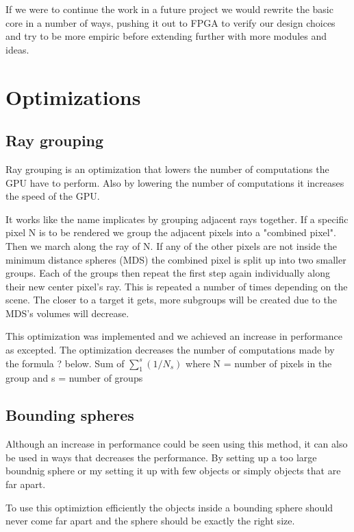 			If we were to continue the work in a future project we would
			rewrite the basic core in a number of ways, pushing it out to FPGA
			to verify our design choices and try to be more empiric before
			extending further with more modules and ideas. 

	\section{Optimizations}

		\subsection{Ray grouping}
		
			Ray grouping is an optimization that lowers the number of
			computations the GPU have to perform. Also by lowering the number of
			computations it increases the speed of the GPU.
			
			It works like the name implicates by grouping adjacent rays
			together. If a specific pixel N is to be rendered we group the
			adjacent pixels into a "combined pixel". Then we march along the
			ray of N. If any of the other pixels are not inside the minimum
			distance spheres (MDS) the combined pixel is split up into two
			smaller groups. Each of the groups then repeat the first step again
			individually along their new center pixel's ray. This is repeated a
			number of times depending on the scene.  The closer to a target it
			gets, more subgroups will be created due to the MDS's volumes will
			decrease.
			
			This optimization was implemented and we achieved an increase in
			performance as excepted. The optimization decreases the number of
			computations made by the formula ? below.  Sum of $\sum_1^s(1/N_s)$
			where N = number of pixels in the group and s = number of groups


		\subsection{Bounding spheres}
			
			Although an increase in performance could be seen using this method,
			it can also be used in ways that decreases the performance. By
			setting up a too large boundnig sphere or my setting it up with few
			objects or simply objects that are far apart.

			To use this optimiztion efficiently the objects inside a bounding 
			sphere should never come far apart and the sphere should be exactly 
			the right size.

